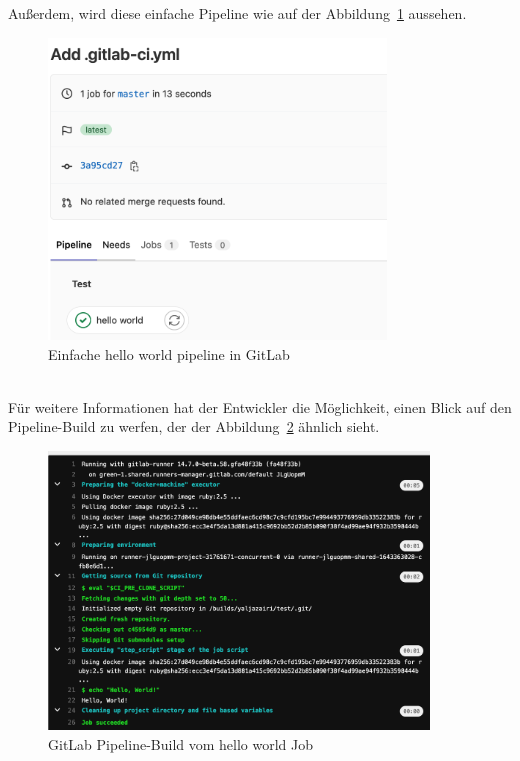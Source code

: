 \pagebreak
Außerdem, wird diese einfache Pipeline wie auf der Abbildung~\ref{fig:GitLabHelloWorldPipeline} aussehen.

\begin{figure}[!htbp]%
	\centering
	\includegraphics[width=0.8\textwidth]{Graphics/GitLab-helloWorld_pipeline.png}
	\caption{Einfache hello world pipeline in GitLab}
	\label{fig:GitLabHelloWorldPipeline}
\end{figure}
\ \\
Für weitere Informationen hat der Entwickler die Möglichkeit, einen Blick auf den Pipeline-Build zu werfen, der der Abbildung~\ref{fig:GitLabPipelineBuild} ähnlich sieht.

\pagebreak
\begin{figure}[!htbp]%
	\centering
	\includegraphics[width=0.9\textwidth]{Graphics/GitLab-pipeline-job-build.png}
	\caption{GitLab Pipeline-Build vom hello world Job}
	\label{fig:GitLabPipelineBuild}
\end{figure}

